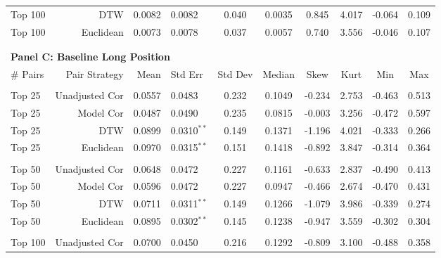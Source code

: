 \begin{table}[hp]
\begin{threeparttable}
\begin{tabular}{l r r l c c c c c c}
            Top 100   & DTW            &  0.0082 & 0.0082          & 0.040 &  0.0035 &  0.845 & 4.017 & -0.064 & 0.109 \\
            Top 100   & Euclidean      &  0.0073 & 0.0078          & 0.037 &  0.0057 &  0.740 & 3.556 & -0.046 & 0.107 \\
            \vspace{-1mm} \\
            \hline
            \vspace{1 mm} \\
            \multicolumn{9}{l}{\textbf{Panel C: Baseline Long Position}} \\
            \# Pairs & Pair Strategy & Mean & Std Err & Std Dev & Median & Skew & Kurt & Min & Max \\
            \hline
            \vspace{-1mm} \\
            Top 25    & Unadjusted Cor & 0.0557 & 0.0483          & 0.232 & 0.1049 & -0.234 & 2.753 & -0.463 & 0.513 \\
            Top 25    & Model Cor      & 0.0487 & 0.0490          & 0.235 & 0.0815 & -0.003 & 3.256 & -0.472 & 0.597 \\
            Top 25    & DTW            & 0.0899 & 0.0310{$^{**}$} & 0.149 & 0.1371 & -1.196 & 4.021 & -0.333 & 0.266 \\
            Top 25    & Euclidean      & 0.0970 & 0.0315{$^{**}$} & 0.151 & 0.1418 & -0.892 & 3.847 & -0.314 & 0.364 \\
            \vspace{-1mm} \\
            Top 50    & Unadjusted Cor & 0.0648 & 0.0472          & 0.227 & 0.1161 & -0.633 & 2.837 & -0.490 & 0.413 \\
            Top 50    & Model Cor      & 0.0596 & 0.0472          & 0.227 & 0.0947 & -0.466 & 2.674 & -0.470 & 0.431 \\
            Top 50    & DTW            & 0.0711 & 0.0311{$^{**}$} & 0.149 & 0.1266 & -1.079 & 3.986 & -0.339 & 0.274 \\
            Top 50    & Euclidean      & 0.0895 & 0.0302{$^{**}$} & 0.145 & 0.1238 & -0.947 & 3.559 & -0.302 & 0.304 \\
            \vspace{-1mm} \\
            Top 100   & Unadjusted Cor & 0.0700 & 0.0450          & 0.216 & 0.1292 & -0.809 & 3.100 & -0.488 & 0.358 \\

\end{tabular}
\end{threeparttable}
\end{table}
